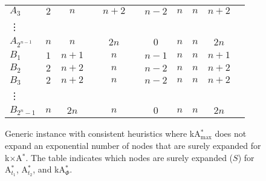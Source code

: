 \documentclass[smallextended]{svjour3}       %
\newcommand{\cmark}{\textcolor{green}{\ding{51}}}
\newcommand{\xmark}{\textcolor{red}{\ding{55}}}
\newcommand{\kastarvar}[1]{\textup{kA}$^*_{#1}$\xspace}
\newcommand{\kastarmax}{\kastarvar{\max}}
\newcommand{\kastarphi}{\textup{kA}$^*_{\Phi}$\xspace}
\newcommand{\kxastar}{k$\times$A$^*$\xspace}
\newcommand{\astari}[1]{A$^*_{#1}$\xspace}
\begin{document}
\begin{figure}
{\begin{tabular}[b]{l*{10}{c}}
	$A_3$       & $2$   & $n$   & \cmark & $n+2$ & \xmark & $n-2$ & $n$   & $n$   & $n+2$ & \cmark \\
	\vdots\\
	$A_{2^{n-1}}$ & $n$ & $n$   & \cmark & $2n$  & \xmark & $0$   & $n$   & $n$   & $2n$  & \cmark \\
	$B_1$       & $1$   & $n+1$ & \xmark & $n$   & \cmark & $n-1$ & $n$   & $n$   & $n+1$ & \cmark \\
	$B_2$       & $2$   & $n+2$ & \xmark & $n$   & \cmark & $n-2$ & $n$   & $n$   & $n+2$ & \cmark \\
	$B_3$       & $2$   & $n+2$ & \xmark & $n$   & \cmark & $n-2$ & $n$   & $n$   & $n+2$ & \cmark \\
	\vdots\\
	$B_{2^n-1}$ & $n$   & $2n$  & \xmark & $n$   & \cmark & $0$   & $n$   & $n$   & $2n$  & \cmark \\
	\bottomrule
	\end{tabular}
	}
	\caption{Generic instance with consistent heuristics where \kastarmax does not expand an exponential number of nodes that are surely expanded for \kxastar.
	The table indicates which nodes are surely expanded ($S$) for \astari{t_1}, \astari{t_2}, and \kastarphi.
	}
	\label{fig:kastarmax-surely-skipped-many}
\end{figure}








\end{document}
